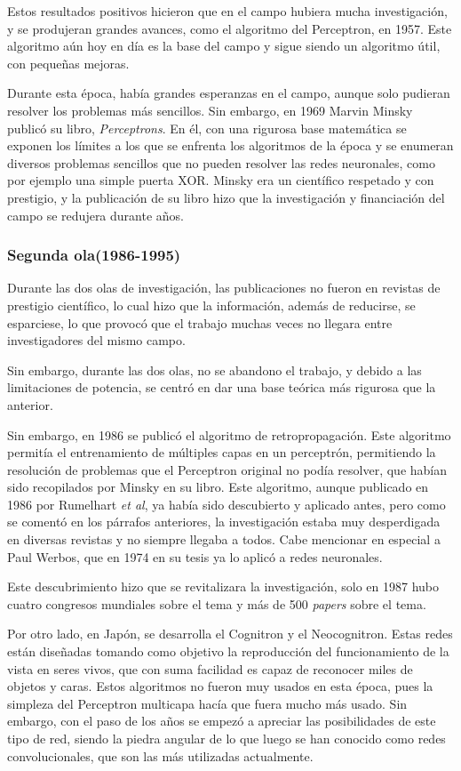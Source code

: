 \documentclass[12pt]{article}
\numberwithin{equation}{section}
\begin{document}
Estos resultados positivos hicieron que en el campo hubiera mucha investigación, y se produjeran grandes avances, como el algoritmo del Perceptron, en 1957\cite{rosenblatt1957perceptron}. Este algoritmo aún hoy en día es la base del campo y sigue siendo un algoritmo útil, con pequeñas mejoras.

Durante esta época, había grandes esperanzas en el campo, aunque solo pudieran resolver los problemas más sencillos. Sin embargo, en 1969 Marvin Minsky publicó su libro, \textit{Perceptrons}\cite{minsky}. En él, con una rigurosa base matemática se exponen los límites a los que se enfrenta los algoritmos de la época y se enumeran diversos problemas sencillos que no pueden resolver las redes neuronales, como por ejemplo una simple puerta XOR. Minsky era un científico respetado y con prestigio, y la publicación de su libro hizo que la investigación y financiación del campo se redujera durante años.
\subsubsection{Segunda ola(1986-1995)}
Durante las dos olas de investigación, las publicaciones no fueron en revistas de prestigio científico, lo cual hizo que la información, además de reducirse, se esparciese, lo que provocó que el trabajo muchas veces no llegara entre investigadores del mismo campo.

Sin embargo, durante las dos olas, no se abandono el trabajo, y debido a las limitaciones de potencia, se centró en dar una base teórica más rigurosa que la anterior.

Sin embargo, en 1986 se publicó el algoritmo de retropropagación\cite{Rumelhart:1988:LRB:65669.104451}. Este algoritmo permitía el entrenamiento de múltiples capas en un perceptrón, permitiendo la resolución de problemas que el Perceptron original no podía resolver, que habían sido recopilados por Minsky en su libro. Este algoritmo, aunque publicado en 1986 por Rumelhart \textit{et al}, ya había sido descubierto y aplicado antes, pero como se comentó en los párrafos anteriores, la investigación estaba muy desperdigada en diversas revistas y no siempre llegaba a todos. Cabe mencionar en especial a Paul Werbos, que en 1974 en su tesis ya lo aplicó a redes neuronales\cite{werbos}. 

Este descubrimiento hizo que se revitalizara la investigación, solo en 1987 hubo cuatro congresos mundiales sobre el tema y más de 500 \textit{papers} sobre el tema.

Por otro lado, en Japón, se desarrolla el Cognitron y el Neocognitron. Estas redes están diseñadas tomando como objetivo la reproducción del funcionamiento de la vista en seres vivos, que con suma facilidad es capaz de reconocer miles de objetos y caras. Estos algoritmos no fueron muy usados en esta época, pues la simpleza del Perceptron multicapa hacía que fuera mucho más usado. Sin embargo, con el paso de los años se empezó a apreciar las posibilidades de este tipo de red, siendo la piedra angular de lo que luego se han conocido como redes convolucionales, que son las más utilizadas actualmente.
\end{document}
